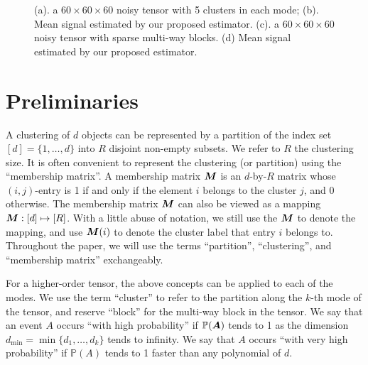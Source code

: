 \documentclass{article}
\begin{document}
\begin{figure}[!h]
	\caption{(a). a $60\times 60\times 60$ noisy tensor with 5 clusters in each mode; %
	(b). Mean signal estimated by our proposed estimator.
	(c). a $60\times 60 \times 60$ noisy tensor with sparse multi-way blocks. 
	(d) Mean signal estimated by our proposed estimator.   
	}
	\label{fig:1}
\end{figure}



\section{Preliminaries}


A clustering of $d$ objects can be represented by a partition of the index set $[d]=\{1,\ldots,d\}$ into $R$ disjoint non-empty subsets. We refer to $R$ the clustering size. It is often convenient to represent the clustering (or partition) using the ``membership matrix''. A membership matrix $\bm M$ is an $d$-by-$R$ matrix whose $(i,j)$-entry is 1 if and only if the element $i$ belongs to the cluster $j$, and 0 otherwise. 
The membership matrix $\bm M$ can also be viewed as a mapping $\bm M:[d]\mapsto[R]$. With a little abuse of notation, we still use the $\bm M$ to denote the mapping, and use $\bm M(i)$ to denote the cluster label that entry $i$ belongs to. Throughout the paper, we will use the terms ``partition'', ``clustering'', and ``membership matrix'' exchangeably. 

For a higher-order tensor, the above concepts can be applied to each of the modes. We use the term ``cluster'' to refer to the partition along the $k$-th mode of the tensor, and reserve ``block'' for the multi-way block in the tensor. We say that an event $A$ occurs ``with high probability'' if $\mathbb{P}(\bm A)$ tends to 1 as the dimension $d_{\min}=\min\{d_1,\ldots,d_k\}$ tends to infinity. We say that $A$ occurs ``with very high probability'' if $\mathbb{P}(A)$ tends to 1 faster than any polynomial of $d$. 
\end{document}

